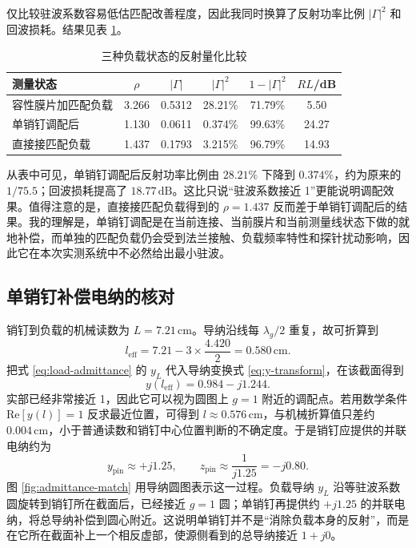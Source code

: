 \documentclass[UTF8]{ctexart}
\begin{document}
仅比较驻波系数容易低估匹配改善程度，因此我同时换算了反射功率比例 $|\Gamma|^2$ 和回波损耗。结果见表 \ref{tab:match-compare}。

\begin{table}[H]
  \centering
  \caption{三种负载状态的反射量化比较}
  \label{tab:match-compare}
  \begin{tabular}{lccccc}
    \toprule
    测量状态 & $\rho$ & $|\Gamma|$ & $|\Gamma|^2$ & $1-|\Gamma|^2$ & $RL$/dB \\
    \midrule
    容性膜片加匹配负载 & 3.266 & 0.5312 & 28.21\% & 71.79\% & 5.50 \\
    单销钉调配后 & 1.130 & 0.0611 & 0.374\% & 99.63\% & 24.27 \\
    直接接匹配负载 & 1.437 & 0.1793 & 3.215\% & 96.79\% & 14.93 \\
    \bottomrule
  \end{tabular}
\end{table}

从表中可见，单销钉调配后反射功率比例由 $28.21\%$ 下降到 $0.374\%$，约为原来的 $1/75.5$；回波损耗提高了 $18.77\,\mathrm{dB}$。这比只说“驻波系数接近 1”更能说明调配效果。值得注意的是，直接接匹配负载得到的 $\rho=1.437$ 反而差于单销钉调配后的结果。我的理解是，单销钉调配是在当前连接、当前膜片和当前测量线状态下做的就地补偿，而单独的匹配负载仍会受到法兰接触、负载频率特性和探针扰动影响，因此它在本次实测系统中不必然给出最小驻波。

\subsection{单销钉补偿电纳的核对}

销钉到负载的机械读数为 $L=7.21\,\mathrm{cm}$。导纳沿线每 $\lambda_g/2$ 重复，故可折算到
\begin{equation}
  l_\mathrm{eff}=7.21-3\times\frac{4.420}{2}=0.580\,\mathrm{cm}.
\end{equation}
把式 \eqref{eq:load-admittance} 的 $y_L$ 代入导纳变换式 \eqref{eq:y-transform}，在该截面得到
\begin{equation}
  y(l_\mathrm{eff})=0.984-j1.244.
\end{equation}
实部已经非常接近 1，因此它可以视为圆图上 $g=1$ 附近的调配点。若用数学条件 $\mathrm{Re}[y(l)]=1$ 反求最近位置，可得到 $l\approx0.576\,\mathrm{cm}$，与机械折算值只差约 $0.004\,\mathrm{cm}$，小于普通读数和销钉中心位置判断的不确定度。于是销钉应提供的并联电纳约为
\begin{equation}
  y_\mathrm{pin}\approx+j1.25,\qquad
  z_\mathrm{pin}\approx\frac{1}{j1.25}=-j0.80.
\end{equation}
图 \ref{fig:admittance-match} 用导纳圆图表示这一过程。负载导纳 $y_L$ 沿等驻波系数圆旋转到销钉所在截面后，已经接近 $g=1$ 圆；单销钉再提供约 $+j1.25$ 的并联电纳，将总导纳补偿到圆心附近。这说明单销钉并不是“消除负载本身的反射”，而是在它所在截面补上一个相反虚部，使源侧看到的总导纳接近 $1+j0$。
\end{document}
